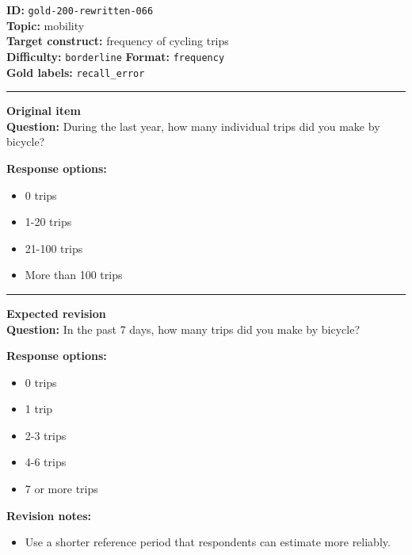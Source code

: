 \documentclass[10pt,a4paper]{article}
\newcommand{\sectionline}{\vspace{0.15em}\hrule\vspace{0.35em}}
\begin{document}
\begin{tcolorbox}[colframe=FlawRed,colback=white,colbacktitle=FlawRed!9,coltitle=black,title={Item 066\hfill Flawed item}]
\textbf{ID:} \texttt{gold-200-rewritten-066}\\
\textbf{Topic:} mobility\\
\textbf{Target construct:} frequency of cycling trips\\
\textbf{Difficulty:} \texttt{borderline} \quad \textbf{Format:} \texttt{frequency}\\
\textbf{Gold labels:} \texttt{recall\_error}\\
\sectionline
\textbf{Original item}\\
\textbf{Question:} During the last year, how many individual trips did you make by bicycle?
\par\textbf{Response options:}
\begin{itemize}
\item 0 trips
\item 1-20 trips
\item 21-100 trips
\item More than 100 trips
\end{itemize}
\sectionline
\textbf{Expected revision}\\
\textbf{Question:} In the past 7 days, how many trips did you make by bicycle?
\par\textbf{Response options:}
\begin{itemize}
\item 0 trips
\item 1 trip
\item 2-3 trips
\item 4-6 trips
\item 7 or more trips
\end{itemize}
\par\textbf{Revision notes:}
\begin{itemize}
\item Use a shorter reference period that respondents can estimate more reliably.
\end{itemize}
\end{tcolorbox}
\end{document}
